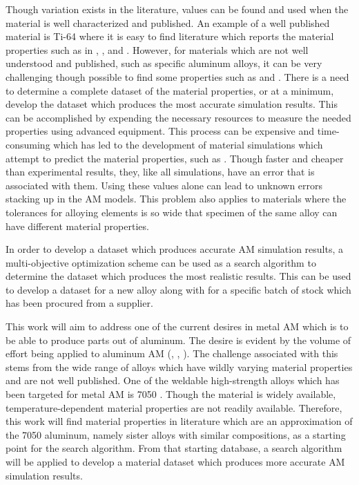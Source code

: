 Though variation exists in the literature, values can be found and used when the material is well characterized and published.  An example of a well published material is Ti-64 where it is easy to find literature which reports the material properties such as in \cite{welschgerhard_1993}, \cite{boivineau_2006}, and  \cite{fan_2012}.  However, for materials which are not well understood and published, such as specific aluminum alloys, it can be very challenging though possible to find some properties such as \cite{lundberg_material_1994} and \cite{leitner_thermophysical_2017}.  There is a need to determine a complete dataset of the material properties, or at a minimum, develop the dataset which produces the most accurate simulation results. 
This can be accomplished by expending the necessary resources to measure the needed properties using advanced equipment.
This process can be expensive and time-consuming which has led to the development of material simulations which attempt to predict the material properties, such as \cite{jmatpro}.  Though faster and cheaper than experimental results, they, like all simulations, have an error that is associated with them.  Using these values alone can lead to unknown errors stacking up in the \ac{AM} models.
This problem also applies to materials where the tolerances for alloying elements is so wide that specimen of the same alloy can have different material properties.  

In order to develop a dataset which produces accurate \ac{AM} simulation results, a multi-objective optimization scheme can be used as a search algorithm to determine the dataset which produces the most realistic results.  This can be used to develop a dataset for a new alloy along with for a specific batch of stock which has been procured from a supplier. 

This work will aim to address one of the current desires in metal \ac{AM} which is to be able to produce parts out of aluminum.  The desire is evident by the volume of effort being applied to aluminum \ac{AM} (\cite{qiHighStrengthLi2020}, \cite{weissImprovedHighTemperatureAluminum2019}, \cite{weissDevelopmentsAluminumScandiumCeramicAluminumScandiumCerium2019}).  The challenge associated with this stems from the wide range of alloys which have wildly varying material properties and are not well published.  One of the weldable high-strength alloys which has been targeted for metal \ac{AM} is 7050 \cite{singhAdditiveManufacturing4047}.  Though the material is widely available, temperature-dependent material properties are not readily available.  Therefore, this work will find material properties in literature which are an approximation of the 7050 aluminum, namely sister alloys with similar compositions, as a starting point for the search algorithm.  From that starting database, a search algorithm will be applied to develop a material dataset which produces more accurate \ac{AM} simulation results. 


